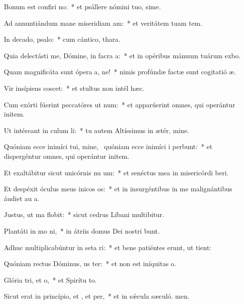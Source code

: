\item Bonum est confiri no:~* et psállere nómini tuo, sime.
\item Ad annuntiándum mane miseridiam am:~* et veritátem tuam  tem.
\item In decado, psalo:~* cum cántico,  thara.
\item Quia delectásti me, Dómine, in facra a:~* et in opéribus mánuum tuárum exbo.
\item Quam magnificáta sunt ópera a, ne!~* nimis profúndæ factæ sunt cogitatió æ.
\item Vir insípiens  coscet:~* et stultus non intél hæc.
\item Cum exórti fúerint peccatóres ut num:~* et apparúerint omnes, qui operántur initem.
\item Ut intéreant in culum li:~* tu autem Altíssimus in ætér, mine.
\item Quóniam ecce inimíci tui, mine,~\pscross{} quóniam ecce inimíci i perbunt:~* et dispergéntur omnes, qui operántur initem.
\item Et exaltábitur sicut unicórnis nu um:~* et senéctus mea in misericórdi beri.
\item Et despéxit óculus meus inicos os:~* et in insurgéntibus in me malignántibus áudiet au a.
\item Justus, ut ma flobit:~* sicut cedrus Líbani multibitur.
\item Plantáti in mo ni,~* in átriis domus Dei nostri bunt.
\item Adhuc multiplicabúntur in seta ri:~* et bene patiéntes erunt, ut tient:
\item Quóniam rectus Dóminus, us ter:~* et non est iníquitas  o.
\item Glória tri, et o,~* et Spirítu to.
\item Sicut erat in princípio, et , et per,~* et in sǽcula sæculó. men.
